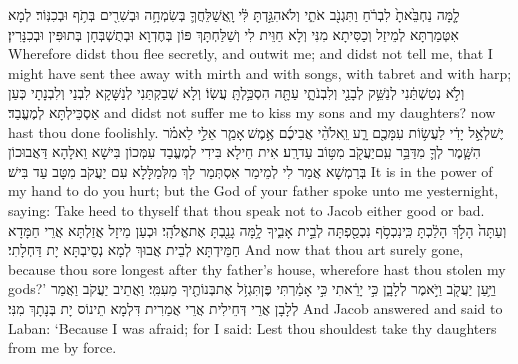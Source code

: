 {לָ֤מָּה נַחְבֵּ֙אתָ֙ לִבְרֹ֔חַ וַתִּגְנֹ֖ב אֹתִ֑י וְלֹא\maqqaf הִגַּ֣דְתָּ לִּ֔י וָֽאֲשַׁלֵּחֲךָ֛ בְּשִׂמְחָ֥ה וּבְשִׁרִ֖ים בְּתֹ֥ף וּבְכִנּֽוֹר׃}
{לְמָא אִטְּמַרְתָּא לְמֵיזַל וְכַסִּיתָא מִנִּי וְלָא חַוֵּית לִי וְשַׁלַּחְתָּךְ פּוֹן בְּחֶדְוָא וּבְתֻשְׁבְּחָן בְּתוּפִּין וּבְכִנָּרִין׃}
{Wherefore didst thou flee secretly, and outwit me; and didst not tell me, that I might have sent thee away with mirth and with songs, with tabret and with harp;}{}
{וְלֹ֣א נְטַשְׁתַּ֔נִי לְנַשֵּׁ֥ק לְבָנַ֖י וְלִבְנֹתָ֑י עַתָּ֖ה הִסְכַּ֥לְתָּֽ עֲשֽׂוֹ׃}
{וְלָא שְׁבַקְתַּנִי לְנַשָּׁקָא לִבְנַי וְלִבְנָתָי כְּעַן אַסְכֵּילְתָּא לְמֶעֱבַד׃}
{and didst not suffer me to kiss my sons and my daughters? now hast thou done foolishly.}{}
{יֶשׁ\maqqaf לְאֵ֣ל יָדִ֔י לַעֲשׂ֥וֹת עִמָּכֶ֖ם רָ֑ע וֵֽאלֹהֵ֨י אֲבִיכֶ֜ם אֶ֣מֶשׁ \legarmeh  אָמַ֧ר אֵלַ֣י לֵאמֹ֗ר הִשָּׁ֧מֶר לְךָ֛ מִדַּבֵּ֥ר עִֽם\maqqaf יַעֲקֹ֖ב מִטּ֥וֹב עַד\maqqaf רָֽע׃}
{אִית חֵילָא בִּידִי לְמֶעֱבַד עִמְּכוֹן בִּישָׁא וֵאלָהָא דַּאֲבוּכוֹן בְּרַמְשָׁא אֲמַר לִי לְמֵימַר אִסְתְּמַר לָךְ מִלְּמַלָּלָא עִם יַעֲקֹב מִטָּב עַד בִּישׁ׃}
{It is in the power of my hand to do you hurt; but the God of your father spoke unto me yesternight, saying: Take heed to thyself that thou speak not to Jacob either good or bad.}{}
{וְעַתָּה֙ הָלֹ֣ךְ הָלַ֔כְתָּ כִּֽי\maqqaf נִכְסֹ֥ף נִכְסַ֖פְתָּה לְבֵ֣ית אָבִ֑יךָ לָ֥מָּה גָנַ֖בְתָּ אֶת\maqqaf אֱלֹהָֽי׃}
{וּכְעַן מֵיזָל אֲזַלְתָּא אֲרֵי חַמָּדָא חַמֵּידְתָּא לְבֵית אֲבוּךְ לְמָא נְסֵיבְתָּא יָת דַּחְלָתִי׃}
{And now that thou art surely gone, because thou sore longest after thy father’s house, wherefore hast thou stolen my gods?’}{}
{וַיַּ֥עַן יַעֲקֹ֖ב וַיֹּ֣אמֶר לְלָבָ֑ן כִּ֣י יָרֵ֔אתִי כִּ֣י אָמַ֔רְתִּי פֶּן\maqqaf תִּגְזֹ֥ל אֶת\maqqaf בְּנוֹתֶ֖יךָ מֵעִמִּֽי׃}
{וַאֲתֵיב יַעֲקֹב וַאֲמַר לְלָבָן אֲרֵי דְּחֵילִית אֲרֵי אֲמַרִית דִּלְמָא תֵינוֹס יָת בְּנָתָךְ מִנִּי׃}
{And Jacob answered and said to Laban: ‘Because I was afraid; for I said: Lest thou shouldest take thy daughters from me by force.}{}
